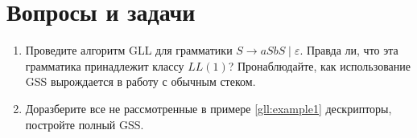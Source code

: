 \section{Вопросы и задачи}
\begin{enumerate}
  \item Проведите алгоритм GLL для грамматики $ S \to a S b S \mid \varepsilon$. Правда ли, что эта грамматика принадлежит классу $ LL(1) $? Пронаблюдайте, как использование GSS вырождается в работу с обычным стеком. 
  \item Доразберите все не рассмотренные в примере \ref{gll:example1} дескрипторы, постройте полный GSS.
\end{enumerate}

